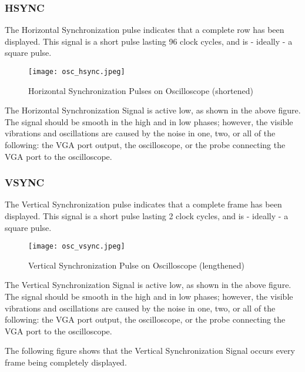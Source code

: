 \subsubsection{HSYNC}
\par The Horizontal Synchronization pulse indicates that a complete row has been displayed. This signal is a short pulse lasting 96 clock cycles, and is - ideally - a square pulse. \newline

\begin{figure}[H]
	\centering
	\texttt{[image: osc\_hsync.jpeg]}
	\caption{ Horizontal Synchronization Pulses on Oscilloscope (shortened) }
	\label{fig:oschsync}  
\end{figure}

\par The Horizontal Synchronization Signal is active low, as shown in the above figure. The signal should be smooth in the high and in low phases; however, the visible vibrations and oscillations are caused by the noise in one, two, or all of the following: the VGA port output, the oscilloscope, or the probe connecting the VGA port to the oscilloscope. \newline

\subsubsection{VSYNC}
\par The Vertical Synchronization pulse indicates that a complete frame has been displayed. This signal is a short pulse lasting 2 clock cycles, and is - ideally - a square pulse. \newline

\begin{figure}[H]
	\centering
	\texttt{[image: osc\_vsync.jpeg]}
	\caption{ Vertical Synchronization Pulse on Oscilloscope (lengthened) }
	\label{fig:oscvsync}  
\end{figure}

\par The Vertical Synchronization Signal is active low, as shown in the above figure. The signal should be smooth in the high and in low phases; however, the visible vibrations and oscillations are caused by the noise in one, two, or all of the following: the VGA port output, the oscilloscope, or the probe connecting the VGA port to the oscilloscope. \newline
\par The following figure shows that the Vertical Synchronization Signal occurs every frame being completely displayed. \newline

